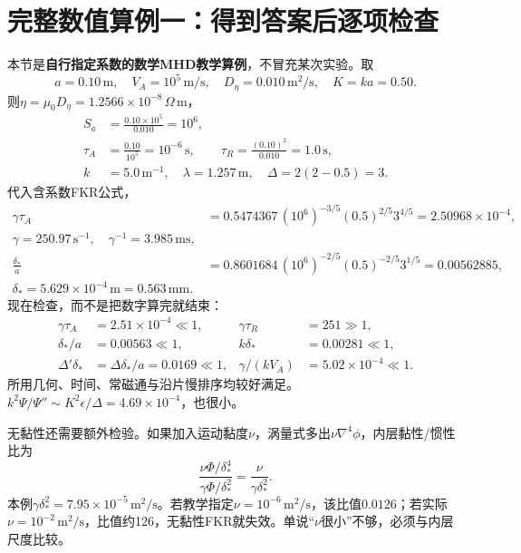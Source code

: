 \section{完整数值算例一：得到答案后逐项检查}
本节是\textbf{自行指定系数的数学MHD教学算例}，不冒充某次实验。取
\begin{equation}
 a=0.10\,\mathrm m,\quad V_A=10^5\,\mathrm{m/s},\quad
 D_\eta=0.010\,\mathrm{m^2/s},\quad K=ka=0.50.
\end{equation}
则$\eta=\mu_0D_\eta=1.2566\times10^{-8}\,\Omega\,\mathrm m$，
\begin{align}
 S_a&=\frac{0.10\times10^5}{0.010}=10^6,\\
 \tau_A&=\frac{0.10}{10^5}=10^{-6}\,\mathrm s,\qquad
 \tau_R=\frac{(0.10)^2}{0.010}=1.0\,\mathrm s,\\
 k&=5.0\,\mathrm{m^{-1}},\quad\lambda=1.257\,\mathrm m,\quad
 \Delta=2(2-0.5)=3.
\end{align}
代入含系数FKR公式，
\begin{align}
 \gamma\tau_A&=0.5474367\,(10^6)^{-3/5}(0.5)^{2/5}3^{4/5}
 =2.50968\times10^{-4},\\
 \boxed{\gamma=250.97\,\mathrm{s^{-1}},\quad\gamma^{-1}=3.985\,\mathrm{ms}},\\
 \frac{\delta_*}{a}&=0.8601684\,(10^6)^{-2/5}(0.5)^{-2/5}3^{1/5}
 =0.00562885,\\
 \boxed{\delta_*=5.629\times10^{-4}\,\mathrm m=0.563\,\mathrm{mm}.}
\end{align}
现在检查，而不是把数字算完就结束：
\begin{align}
 \gamma\tau_A&=2.51\times10^{-4}\ll1,&\gamma\tau_R&=251\gg1,\\
 \delta_*/a&=0.00563\ll1,&k\delta_*&=0.00281\ll1,\\
 \Delta'\delta_*&=\Delta\delta_*/a=0.0169\ll1,&
 \gamma/(kV_A)&=5.02\times10^{-4}\ll1.
\end{align}
所用几何、时间、常磁通与沿片慢排序均较好满足。$k^2\Psi/\Psi''\sim K^2\epsilon/\Delta=4.69\times10^{-4}$，也很小。

无黏性还需要额外检验。如果加入运动黏度$\nu$，涡量式多出$\nu\nabla^4\phi$，内层黏性/惯性比为
\begin{equation}
 \frac{\nu\Phi/\delta_*^4}{\gamma\Phi/\delta_*^2}
 =\frac{\nu}{\gamma\delta_*^2}.
\end{equation}
本例$\gamma\delta_*^2=7.95\times10^{-5}\,\mathrm{m^2/s}$。若教学指定$\nu=10^{-6}\,\mathrm{m^2/s}$，该比值$0.0126$；若实际$\nu=10^{-2}\,\mathrm{m^2/s}$，比值约126，无黏性FKR就失效。单说“$\nu$很小”不够，必须与内层尺度比较。

